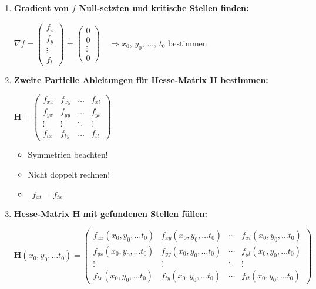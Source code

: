 \begin{enumerate}[itemsep=1ex]
    \item \textbf{Gradient von $f$ Null-setzten und kritische Stellen finden:}
    
    $\nabla f=
    \begin{pmatrix}
        f_x\\
        f_y\\
        \vdots \\
        f_t
    \end{pmatrix} \stackrel{!}{=}
    \begin{pmatrix}
        0\\
        0\\
        \vdots \\
        0
    \end{pmatrix}
    \quad \Rightarrow x_0$, $y_0$, $\ldots$, $t_0$ bestimmen
    
    \item \textbf{Zweite Partielle Ableitungen für Hesse-Matrix H bestimmen:}
    
    \begin{minipage}[t]{0.48\columnwidth}
        $\mathbf{H}=\begin{pmatrix}
            f_{xx}&f_{xy}&\ldots &f_{xt}\\
            f_{yx}&f_{yy}&\ldots&f_{yt}\\
            \vdots &\vdots &\ddots &\vdots \\
            f_{tx}&f_{ty}&\ldots&f_{tt}
        \end{pmatrix}$
    \end{minipage}\hfill
    \begin{minipage}[c]{0.48\columnwidth}
        \begin{itemize}
            \item Symmetrien beachten!
            \item Nicht doppelt rechnen!
            \item[] \textrightarrow\ $f_{xt} = f_{tx}$
        \end{itemize}
    \end{minipage}

    \item \textbf{Hesse-Matrix H mit gefundenen Stellen füllen:}

    $\mathbf{H}(x_0,y_0,\ldots t_0)=
    \begin{pmatrix}
        f_{xx}(x_0,y_0,\ldots t_0)&f_{xy}(x_0,y_0, \ldots t_0)&\cdots &f_{xt}(x_0,y_0,\ldots t_0)\\
        f_{yx}(x_0,y_0,\ldots t_0)&f_{yy}(x_0,y_0, \ldots t_0)&\cdots &f_{yt}(x_0,y_0,\ldots t_0)\\
        \vdots &\vdots &\ddots &\vdots \\
        f_{tx}(x_0,y_0,\ldots t_0)&f_{ty}(x_0,y_0, \ldots t_0)&\cdots &f_{tt}(x_0,y_0,\ldots t_0)\end{pmatrix}$


\end{enumerate}
